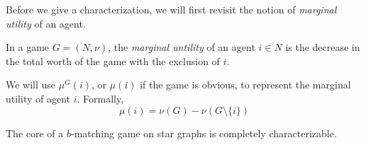 Before we give a characterization, we will first revisit the notion of \textit{marginal utility} of an agent.
\begin{definition}
    In a game $G=(N,\nu)$, the \textit{marginal untility} of an agent $i \in N$ is the decrease in the total worth of the game with the exclusion of $i$.
\end{definition}

We will use $\mu^G(i)$, or $\mu(i)$ if the game is obvious, to represent the marginal utility of agent $i$. Formally, $$ \mu(i) = \nu(G) - \nu(G\setminus \{i\}) $$


\begin{theorem}
\label{thm:star_core_characterization}
    The core of a $b$-matching game on star graphs is completely characterizable. 
\end{theorem}

